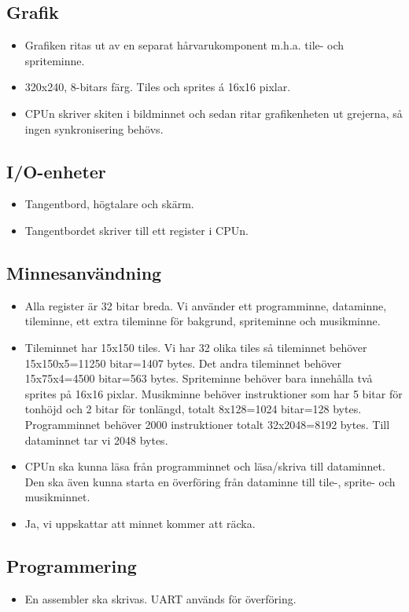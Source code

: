 \documentclass[a4paper,titlepage]{article}
\begin{document}
	\subsection{Grafik}
        \begin{itemize}
			\item Grafiken ritas ut av en separat hårvarukomponent m.h.a. tile-
				och spriteminne.
			\item 320x240, 8-bitars färg. Tiles och sprites á 16x16 pixlar.
			\item CPUn skriver skiten i bildminnet och sedan ritar
				grafikenheten ut grejerna, så ingen synkronisering behövs.
        \end{itemize}
	\subsection{I/O-enheter}
        \begin{itemize}
			\item Tangentbord, högtalare och skärm.
			\item Tangentbordet skriver till ett register i CPUn.
        \end{itemize}
	\subsection{Minnesanvändning}
        \begin{itemize}
			\item Alla register är 32 bitar breda. Vi använder ett
				programminne, dataminne, tileminne, ett extra tileminne för
				bakgrund, spriteminne och musikminne.
			\item Tileminnet har 15x150 tiles. Vi har 32 olika tiles så
				tileminnet behöver 15x150x5=11250 bitar=1407 bytes. Det andra
				tileminnet behöver 15x75x4=4500 bitar=563 bytes. Spriteminne
				behöver bara innehålla två sprites på 16x16 pixlar. Musikminne
				behöver instruktioner som har 5 bitar för tonhöjd och 2 bitar
				för tonlängd, totalt 8x128=1024 bitar=128 bytes. Programminnet
				behöver 2000 instruktioner totalt 32x2048=8192 bytes. Till
				dataminnet tar vi 2048 bytes.
			\item CPUn ska kunna läsa från programminnet och läsa/skriva till
				dataminnet. Den ska även kunna starta en överföring från
				dataminne till tile-, sprite- och musikminnet. 
			\item Ja, vi uppskattar att minnet kommer att räcka.
        \end{itemize}
	\subsection{Programmering}
        \begin{itemize}
			\item En assembler ska skrivas. UART används för överföring. 
        \end{itemize}
\end{document}
